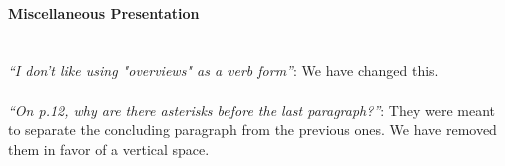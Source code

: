 \documentclass[10pt,twocolumn]{article}
\begin{document}


\paragraph{Miscellaneous Presentation}~\\
\emph{``I don't like using "overviews" as a verb form''}: We have changed this.\\~\\
\emph{``On p.12, why are there asterisks before the last paragraph?''}: They
were meant to separate the concluding paragraph from the previous
ones. We have removed them in favor of a vertical space.


\end{document}

